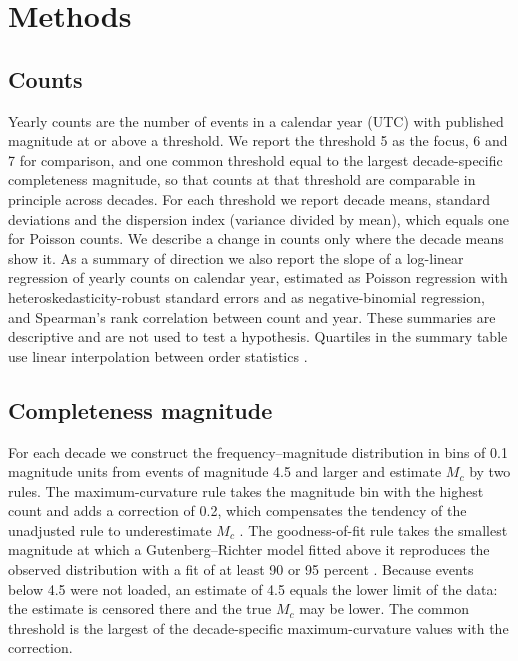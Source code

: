 \documentclass[11pt]{article}
\begin{document}
\section{Methods}

\subsection{Counts}

Yearly counts are the number of events in a calendar year (UTC) with published magnitude at or above a threshold. We report the threshold 5 as the focus, 6 and 7 for comparison, and one common threshold equal to the largest decade-specific completeness magnitude, so that counts at that threshold are comparable in principle across decades. For each threshold we report decade means, standard deviations and the dispersion index (variance divided by mean), which equals one for Poisson counts. We describe a change in counts only where the decade means show it. As a summary of direction we also report the slope of a log-linear regression of yearly counts on calendar year, estimated as Poisson regression with heteroskedasticity-robust standard errors and as negative-binomial regression, and Spearman's rank correlation \citep{spearman1904proof} between count and year. These summaries are descriptive and are not used to test a hypothesis. Quartiles in the summary table use linear interpolation between order statistics \citep{hyndman1996sample}.

\subsection{Completeness magnitude}

For each decade we construct the frequency--magnitude distribution in bins of 0.1 magnitude units from events of magnitude 4.5 and larger and estimate $M_c$ by two rules. The maximum-curvature rule takes the magnitude bin with the highest count and adds a correction of 0.2, which compensates the tendency of the unadjusted rule to underestimate $M_c$ \citep{wiemer2000minimum, woessner2005assessing}. The goodness-of-fit rule takes the smallest magnitude at which a Gutenberg--Richter model fitted above it reproduces the observed distribution with a fit of at least 90 or 95 percent \citep{wiemer2000minimum}. Because events below 4.5 were not loaded, an estimate of 4.5 equals the lower limit of the data: the estimate is censored there and the true $M_c$ may be lower. The common threshold is the largest of the decade-specific maximum-curvature values with the correction.
\end{document}
